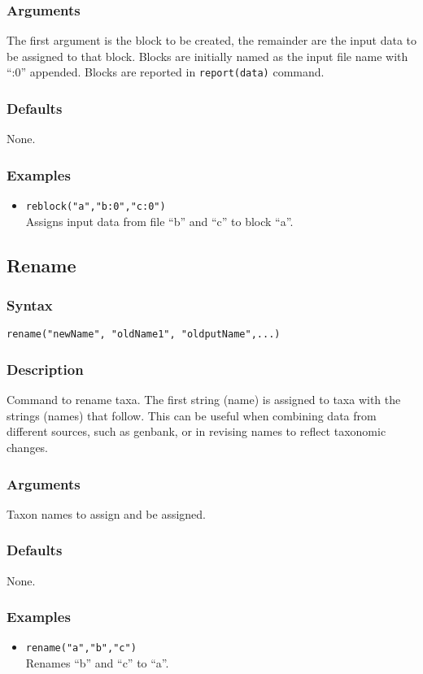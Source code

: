 \documentclass[11pt]{article}
\begin{document}
	\subsubsection{Arguments}
	The first argument is the block to be created, the remainder are the input data to be 
	assigned to that block. Blocks are initially named as the input file name with ``:0'' appended.  Blocks are reported in \texttt{report(data)} command.
	\subsubsection{Defaults}
	None.
	\subsubsection{Examples}
	\begin{itemize}
		\item{\texttt{reblock("a","b:0","c:0")}\\ Assigns input data from file ``b'' and ``c'' to block ``a''. }
	\end{itemize}
	
	\subsection{Rename}
		\subsubsection{Syntax}
			\texttt{rename("newName", "oldName1", "oldputName",...)}
		\subsubsection{Description}
			Command to rename taxa.  The first string (name) is assigned to taxa with the strings (names) that follow. This can be useful when combining data from
			different sources, such as genbank, or in revising names to reflect taxonomic changes.
		\subsubsection{Arguments}
			Taxon names to assign and be assigned.
		\subsubsection{Defaults}
			None.
		\subsubsection{Examples}
			 \begin{itemize}
			 	\item{\texttt{rename("a","b","c")}\\ Renames ``b'' and ``c'' to ``a''. }
			\end{itemize}
		
\end{document}
